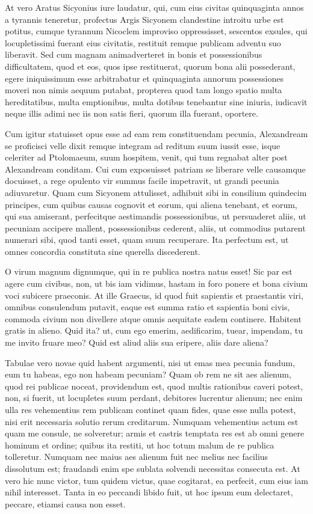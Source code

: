  At vero Aratus Sicyonius iure laudatur, qui, cum eius civitas quinquaginta annos a tyrannis teneretur, profectus Argis Sicyonem clandestine introitu urbe est potitus, cumque tyrannum Nicoclem improviso oppressisset, sescentos exsules, qui locupletissimi fuerant eius civitatis, restituit remque publicam adventu suo liberavit. Sed cum magnam animadverteret in bonis et possessionibus difficultatem, quod et eos, quos ipse restituerat, quorum bona alii possederant, egere iniquissimum esse arbitrabatur et quinquaginta annorum possessiones moveri non nimis aequum putabat, propterea quod tam longo spatio multa hereditatibus, multa emptionibus, multa dotibus tenebantur sine iniuria, iudicavit neque illis adimi nec iis non satis fieri, quorum illa fuerant, oportere.

 Cum igitur statuisset opus esse ad eam rem constituendam pecunia, Alexandream se proficisci velle dixit remque integram ad reditum suum iussit esse, isque celeriter ad Ptolomaeum, suum hospitem, venit, qui tum regnabat alter post Alexandream conditam. Cui cum exposuisset patriam se liberare velle causamque docuisset, a rege opulento vir summus facile impetravit, ut grandi pecunia adiuvaretur. Quam cum Sicyonem attulisset, adhibuit sibi in consilium quindecim principes, cum quibus causas cognovit et eorum, qui aliena tenebant, et eorum, qui sua amiserant, perfecitque aestimandis possessionibus, ut persuaderet aliis, ut pecuniam accipere mallent, possessionibus cederent, aliis, ut commodius putarent numerari sibi, quod tanti esset, quam suum recuperare. Ita perfectum est, ut omnes concordia constituta sine querella discederent.

 O virum magnum dignumque, qui in re publica nostra natus esset! Sic par est agere cum civibus, non, ut bis iam vidimus, hastam in foro ponere et bona civium voci subicere praeconis. At ille Graecus, id quod fuit sapientis et praestantis viri, omnibus consulendum putavit, eaque est summa ratio et sapientia boni civis, commoda civium non divellere atque omnis aequitate eadem continere. Habitent gratis in alieno. Quid ita? ut, cum ego emerim, aedificarim, tuear, impendam, tu me invito fruare meo? Quid est aliud aliis sua eripere, aliis dare aliena?

 Tabulae vero novae quid habent argumenti, nisi ut emas mea pecunia fundum, eum tu habeas, ego non habeam pecuniam? Quam ob rem ne sit aes alienum, quod rei publicae noceat, providendum est, quod multis rationibus caveri potest, non, si fuerit, ut locupletes suum perdant, debitores lucrentur alienum; nec enim ulla res vehementius rem publicam continet quam fides, quae esse nulla potest, nisi erit necessaria solutio rerum creditarum. Numquam vehementius actum est quam me consule, ne solveretur; armis et castris temptata res est ab omni genere hominum et ordine; quibus ita restiti, ut hoc totum malum de re publica tolleretur. Numquam nec maius aes alienum fuit nec melius nec facilius dissolutum est; fraudandi enim spe sublata solvendi necessitas consecuta est. At vero hic nunc victor, tum quidem victus, quae cogitarat, ea perfecit, cum eius iam nihil interesset. Tanta in eo peccandi libido fuit, ut hoc ipsum eum delectaret, peccare, etiamsi causa non esset.

